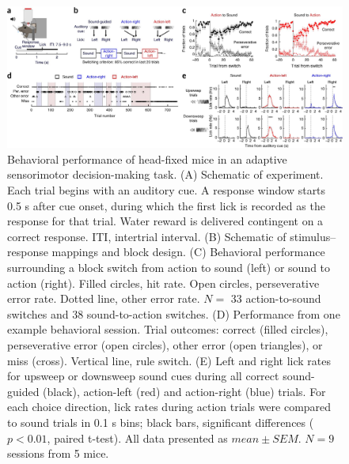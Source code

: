 \begin{figure}[htbp]

\begin{center}
\includegraphics[width=\textwidth]{Figures/NN_fig1.jpg} 
\end{center}

\caption[Behavioral performance of head-fixed mice in an adaptive sensorimotor decision-making task]
{Behavioral performance of head-fixed mice in an adaptive sensorimotor decision-making task.
(A) Schematic of experiment. Each trial begins with an auditory cue. A response window starts 0.5 s after cue onset, during which the first lick is recorded as the response for that trial. Water reward is delivered contingent on a correct response. ITI, intertrial interval. (B) Schematic of stimulus–response mappings and block design. (C) Behavioral performance surrounding a block switch from action to sound (left) or sound to action (right). Filled circles, hit rate. Open circles, perseverative error rate. Dotted line, other error rate. $N=$ 33 action-to-sound switches and 38 sound-to-action switches. (D) Performance from one example behavioral session. Trial outcomes: correct (filled circles), perseverative error (open circles), other error (open triangles), or miss (cross). Vertical line, rule switch. (E) Left and right lick rates for upsweep or downsweep sound cues during all correct sound-guided (black), action-left (red) and action-right (blue) trials. For each choice direction, lick rates during action trials were compared to sound trials in 0.1 s bins; black bars, significant differences ($p < 0.01$, paired t-test). All data presented as $mean \pm SEM$. $N = 9$ sessions from 5 mice.}

\label{fig:NN_fig1}
\end{figure}


